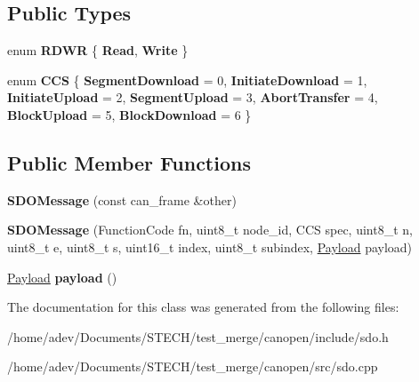 \subsection*{Public Types}
\begin{DoxyCompactItemize}
\item 
\mbox{\label{class_c_a_nopen_1_1_s_d_o_message_aba8926782f1557b8d7d90f430b26cd8d}} 
enum {\bfseries R\+D\+WR} \{ {\bfseries Read}, 
{\bfseries Write}
 \}
\item 
\mbox{\label{class_c_a_nopen_1_1_s_d_o_message_a87e867140acb008777fb9419626d19ea}} 
enum {\bfseries C\+CS} \{ \newline
{\bfseries Segment\+Download} = 0, 
{\bfseries Initiate\+Download} = 1, 
{\bfseries Initiate\+Upload} = 2, 
{\bfseries Segment\+Upload} = 3, 
\newline
{\bfseries Abort\+Transfer} = 4, 
{\bfseries Block\+Upload} = 5, 
{\bfseries Block\+Download} = 6
 \}
\end{DoxyCompactItemize}
\subsection*{Public Member Functions}
\begin{DoxyCompactItemize}
\item 
\mbox{\label{class_c_a_nopen_1_1_s_d_o_message_a73ab5aad06fd6a6f53fb614f4d9a8465}} 
{\bfseries S\+D\+O\+Message} (const can\+\_\+frame \&other)
\item 
\mbox{\label{class_c_a_nopen_1_1_s_d_o_message_ad299429ca0de823d392fb24addf4fe85}} 
{\bfseries S\+D\+O\+Message} (Function\+Code fn, uint8\+\_\+t node\+\_\+id, C\+CS spec, uint8\+\_\+t n, uint8\+\_\+t e, uint8\+\_\+t s, uint16\+\_\+t index, uint8\+\_\+t subindex, \hyperlink{class_c_a_nopen_1_1_payload}{Payload} payload)
\item 
\mbox{\label{class_c_a_nopen_1_1_s_d_o_message_a051509ddb3a59dfe066f9d90c80c2eec}} 
\hyperlink{class_c_a_nopen_1_1_payload}{Payload} {\bfseries payload} ()
\end{DoxyCompactItemize}


The documentation for this class was generated from the following files\+:\begin{DoxyCompactItemize}
\item 
/home/adev/\+Documents/\+S\+T\+E\+C\+H/test\+\_\+merge/canopen/include/sdo.\+h\item 
/home/adev/\+Documents/\+S\+T\+E\+C\+H/test\+\_\+merge/canopen/src/sdo.\+cpp\end{DoxyCompactItemize}
